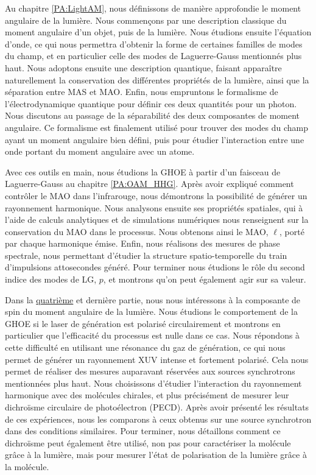 Au chapitre \ref{PA:LightAM}, nous définissons de manière approfondie le moment angulaire de la lumière. Nous commençons par une description classique du moment angulaire d'un objet, puis de la lumière. Nous étudions ensuite l'équation d'onde, ce qui nous permettra d'obtenir la forme de certaines familles de modes du champ, et en particulier celle des modes de Laguerre-Gauss mentionnés plus haut. Nous adoptons ensuite une description quantique, faisant apparaître naturellement la conservation des différentes propriétés de la lumière, ainsi que la séparation entre MAS et MAO. Enfin, nous empruntons le formalisme de l'électrodynamique quantique pour définir ces deux quantités pour un photon. Nous discutons au passage de la séparabilité des deux composantes de moment angulaire. Ce formalisme est finalement utilisé pour trouver des modes du champ ayant un moment angulaire bien défini, puis pour étudier l'interaction entre une onde portant du moment angulaire avec un atome.

Avec ces outils en main, nous étudions la GHOE à partir d'un faisceau de Laguerre-Gauss au chapitre \ref{PA:OAM_HHG}. Après avoir expliqué comment contrôler le MAO dans l'infrarouge, nous démontrons la possibilité de générer un rayonnement harmonique. Nous analysons ensuite ses propriétés spatiales, qui à l'aide de calculs analytiques et de simulations numériques nous renseignent sur la conservation du MAO dans le processus. Nous obtenons ainsi le MAO, $\ell$, porté par chaque harmonique émise. Enfin, nous réalisons des mesures de phase spectrale, nous permettant d'étudier la structure spatio-temporelle du train d'impulsions attosecondes généré. Pour terminer nous étudions le rôle du second indice des modes de LG, $p$, et montrons qu'on peut également agir sur sa valeur.

Dans la \hyperref[PA:Spin_HHG]{quatrième} et dernière partie, nous nous intéressons à la composante de spin du moment angulaire de la lumière. Nous étudions le comportement de la GHOE si le laser de génération est polarisé circulairement et montrons en particulier que l'efficacité du processus est nulle dans ce cas. Nous répondons à cette difficulté en utilisant une résonance du gaz de génération, ce qui nous permet de générer un rayonnement XUV intense et fortement polarisé. Cela nous permet de réaliser des mesures auparavant réservées aux sources synchrotrons mentionnées plus haut. Nous choisissons d'étudier l'interaction du rayonnement harmonique avec des molécules chirales, et plus précisément de mesurer leur dichroïsme circulaire de photoélectron (PECD). Après avoir présenté les résultats de ces expériences, nous les comparons à ceux obtenus sur une source synchrotron dans des conditions similaires. Pour terminer, nous détaillons comment ce dichroïsme peut également être utilisé, non pas pour caractériser la molécule grâce à la lumière, mais pour mesurer l'état de polarisation de la lumière grâce à la molécule.

